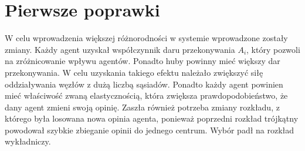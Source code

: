 \section{Pierwsze poprawki}

W celu wprowadzenia większej różnorodności w systemie wprowadzone zostały zmiany. Każdy agent uzyskał współczynnik daru przekonywania $A_i$, który pozwoli na zróżnicowanie wpływu agentów.
Ponadto huby powinny mieć większy dar przekonywania. W celu uzyskania takiego efektu należało zwiększyć siłę oddziaływania węzłów z dużą liczbą sąsiadów.
Ponadto każdy agent powinien mieć właściwość zwaną elastycznością, która zwiększa prawdopodobieństwo, że dany agent zmieni swoją opinię.
Zaszła również potrzeba zmiany rozkładu, z którego była losowana nowa opinia agenta, ponieważ poprzedni rozkład trójkątny powodował szybkie zbieganie opinii do jednego centrum.
Wybór padł na rozkład wykładniczy.

